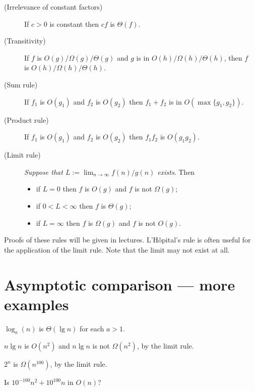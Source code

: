 \begin{description}
\item[(Irrelevance of constant factors)] If $c > 0$ is constant then $cf$ is $\Theta(f)$.
\item[(Transitivity)] If $f$ is $O(g)/\Omega(g)/\Theta(g)$ and $g$ is 
in $O(h)/\Omega(h)/\Theta(h)$, then $f$\\ is $O(h)/\Omega(h)/\Theta(h)$.
\item[(Sum rule)] If $f_1$ is $O(g_1)$ and $f_2$ is $O(g_2)$ then $f_1 + f_2$ is 
in $O(\max\{g_1, g_2\})$.
\item[(Product rule)] If $f_1$ is $O(g_1)$ and $f_2$ is $O(g_2)$ then $f_1 f_2$ 
is $O(g_1 g_2)$.
\item[(Limit rule)] \emph{Suppose that $L:=\lim_{n\to\infty} f(n)/g(n)$ exists}. 
Then
\begin{itemize}
\item if $L = 0$ then $f$ is $O(g)$ and $f$ is not $\Omega(g)$;
\item if $0 < L < \infty$ then $f$ is $\Theta(g)$;
\item if $L = \infty$ then $f$ is $\Omega(g)$ and $f$ is not $O(g)$.
\end{itemize}
\end{description}

Proofs of these rules will be given in lectures. L'H\^{o}pital's rule is often useful for the application of the limit rule. Note that the 
limit may not exist at all.

\section*{Asymptotic comparison --- more examples}

\begin{Boxample}[4]
\item $\log_a(n)$ is $\Theta(\lg n)$ for each $a > 1$.

\end{Boxample}

\begin{Boxample}
$n \lg n$ is $O(n^2)$ and $n \lg n$ is not $\Omega(n^2)$, by the limit rule.
\end{Boxample}
\begin{Boxample}
$2^n$ is $\Omega(n^{100})$, by the limit rule.
\end{Boxample}

\begin{Boxample}[4]
Is $10^{-100} n^2 + 10^{100} n$ in $O(n)$?

\end{Boxample}

